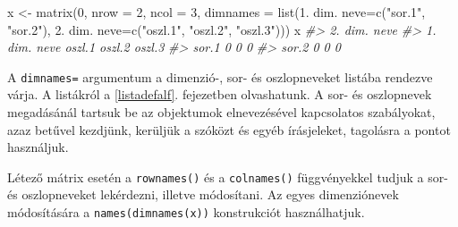 \documentclass[
]{book}
\newenvironment{Shaded}{\begin{snugshade}}{\end{snugshade}}
\newcommand{\AttributeTok}[1]{\textcolor[rgb]{0.77,0.63,0.00}{#1}}
\newcommand{\CommentTok}[1]{\textcolor[rgb]{0.56,0.35,0.01}{\textit{#1}}}
\newcommand{\DecValTok}[1]{\textcolor[rgb]{0.00,0.00,0.81}{#1}}
\newcommand{\FunctionTok}[1]{\textcolor[rgb]{0.00,0.00,0.00}{#1}}
\newcommand{\NormalTok}[1]{#1}
\newcommand{\OtherTok}[1]{\textcolor[rgb]{0.56,0.35,0.01}{#1}}
\newcommand{\StringTok}[1]{\textcolor[rgb]{0.31,0.60,0.02}{#1}}
\begin{document}
\begin{Shaded}
\begin{Highlighting}[]
\NormalTok{x }\OtherTok{\textless{}{-}} \FunctionTok{matrix}\NormalTok{(}\DecValTok{0}\NormalTok{, }\AttributeTok{nrow =} \DecValTok{2}\NormalTok{, }\AttributeTok{ncol =} \DecValTok{3}\NormalTok{, }
      \AttributeTok{dimnames =} \FunctionTok{list}\NormalTok{(}\StringTok{\textquotesingle{}1. dim. neve\textquotesingle{}}\OtherTok{=}\FunctionTok{c}\NormalTok{(}\StringTok{"sor.1"}\NormalTok{, }\StringTok{"sor.2"}\NormalTok{),}
                      \StringTok{\textquotesingle{}2. dim. neve\textquotesingle{}}\OtherTok{=}\FunctionTok{c}\NormalTok{(}\StringTok{"oszl.1"}\NormalTok{, }\StringTok{"oszl.2"}\NormalTok{, }\StringTok{"oszl.3"}\NormalTok{)))}
\NormalTok{x}
\CommentTok{\#\textgreater{}             2. dim. neve}
\CommentTok{\#\textgreater{} 1. dim. neve oszl.1 oszl.2 oszl.3}
\CommentTok{\#\textgreater{}        sor.1      0      0      0}
\CommentTok{\#\textgreater{}        sor.2      0      0      0}
\end{Highlighting}
\end{Shaded}

A \texttt{dimnames=} argumentum a dimenzió-, sor- és oszlopneveket listába rendezve várja. A listákról a \ref{listadefalf}. fejezetben olvashatunk. A sor- és oszlopnevek megadásánál tartsuk be az objektumok elnevezésével kapcsolatos szabályokat, azaz betűvel kezdjünk, kerüljük a szóközt és egyéb írásjeleket, tagolásra a pontot használjuk.

Létező mátrix esetén a \texttt{rownames()} és a \texttt{colnames()} függvényekkel tudjuk a sor- és oszlopneveket lekérdezni, illetve módosítani. Az egyes dimenziónevek módosítására a \texttt{names(dimnames(x))} konstrukciót használhatjuk.
\end{document}
